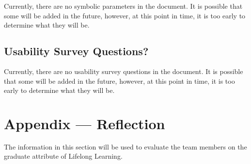\documentclass[12pt, titlepage]{article}
\begin{document}
Currently, there are no symbolic parameters in the document. It is possible that some will be added in the future, however, 
at this point in time, it is too early to determine what they will be.

\subsection{Usability Survey Questions?}

Currently, there are no usability survey questions in the document. It is possible that some will be added in the future, however,
at this point in time, it is too early to determine what they will be.

\newpage{}
\section*{Appendix --- Reflection}


The information in this section will be used to evaluate the team members on the
graduate attribute of Lifelong Learning.


\end{document}
